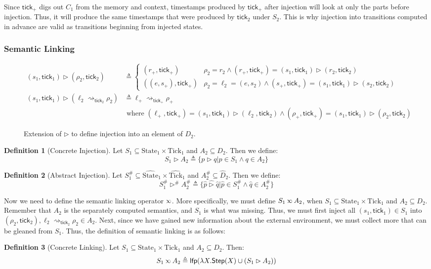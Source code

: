 \documentclass{article}
\theoremstyle{definition}
\newtheorem{definition}{Definition}[section]
\newcommand*{\A}[1]{\widehat{#1}}
\newcommand*{\Abs}[1]{{#1}^{\#}}
\newcommand*{\State}{\text{State}}
\newcommand*{\AState}{\widehat{\text{State}}}
\newcommand*{\Tick}{\text{Tick}}
\newcommand*{\semarrow}{\rightsquigarrow}
\newcommand*{\semlink}{\mathbin{\rotatebox[origin=c]{180}{$\propto$}}}
\newcommand*{\tick}{\mathsf{tick}}
\begin{document}
Since $\tick_+$ digs out $C_1$ from the memory and context, timestamps produced by $\tick_+$ after injection will look at only the parts before injection.
Thus, it will produce the same timestamps that were produced by $\tick_2$ under $S_2$.
This is why injection into transitions computed in advance are valid as transitions beginning from injected states.

\subsubsection{Semantic Linking}
\begin{figure}[h!]
  \begin{align*}
    (s_1,\tick_1)\rhd(\rho_2,\tick_2)                  & \triangleq
    \begin{cases}
      (r_+,\tick_+)     & \rho_2=r_2\wedge(r_+,\tick_+)=(s_1,\tick_1)\rhd(r_2,\tick_2)            \\
      ((e,s_+),\tick_+) & \rho_2=\ell_2=(e,s_2)\wedge(s_+,\tick_+)=(s_1,\tick_1)\rhd(s_2,\tick_2)
    \end{cases} \\
    (s_1,\tick_1)\rhd(\ell_2\semarrow_{\tick_2}\rho_2) & \triangleq
    \ell_+\semarrow_{\tick_+}\rho_+                                                             \\
                                                       & \text{ where }
    (\ell_+,\tick_+)=(s_1,\tick_1)\rhd(\ell_2,\tick_2)\wedge
    (\rho_+,\tick_+)=(s_1,\tick_1)\rhd(\rho_2,\tick_2)
  \end{align*}
  \caption{Extension of $\rhd$ to define injection into an element of $D_2$.}
  \label{fig:extinject}
\end{figure}
\begin{definition}[Concrete Injection]
  Let $S_1\subseteq\State_1\times\Tick_1$ and $A_2\subseteq D_2$. Then we define:
  \[
    S_1\rhd A_2\triangleq\{p\rhd q|p\in S_1\wedge q\in A_2\}
  \]
\end{definition}
\begin{definition}[Abstract Injection]
  Let $\Abs{S}_1\subseteq\AState_1\times\A\Tick_1$ and $\Abs{A}_2\subseteq\A{D}_2$. Then we define:
  \[
    \Abs{S}_1\Abs\rhd\Abs{A}_2\triangleq\{\A{p}\A\rhd\A{q}|\A{p}\in\Abs{S}_1\wedge\A{q}\in\Abs{A}_2\}
  \]
\end{definition}
Now we need to define the semantic linking operator $\semlink$.
More specifically, we must define $S_1\semlink A_2$, when $S_1\subseteq\State_1\times\Tick_1$ and $A_2\subseteq D_2$.
Remember that $A_2$ is the separately computed semantics, and $S_1$ is what was missing.
Thus, we must first inject all $(s_1,\tick_1)\in S_1$ into $(\rho_2,\tick_2),\ell_2\semarrow_{\tick_2}\rho_2\in A_2$.
Next, since we have gained new information about the external environment, we must collect more that can be gleaned from $S_1$.
Thus, the definition of semantic linking is as follows:
\begin{definition}[Concrete Linking]
  Let $S_1\subseteq\State_1\times\Tick_1$ and $A_2\subseteq D_2$.
  Then:
  \[
    S_1\semlink A_2\triangleq
    \mathsf{lfp}(\lambda X.\mathsf{Step}(X)\cup(S_1\rhd A_2))
  \]
\end{definition}
\end{document}
